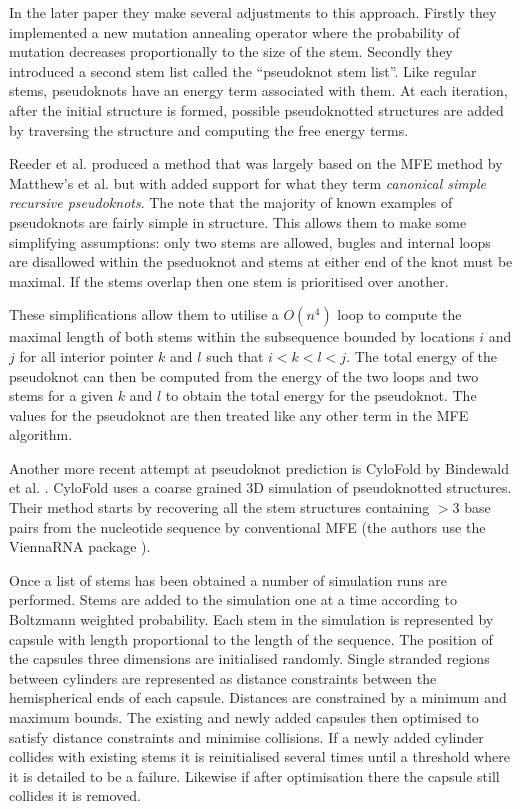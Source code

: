 \documentclass[journal]{IEEEtran}
\begin{document}
In the later paper \cite{shapiro1997predicting} they make several adjustments to this approach. Firstly they implemented a new mutation annealing operator where the probability of mutation decreases proportionally to the size of the stem. Secondly they introduced a second stem list called the ``pseudoknot stem list''. Like regular stems, pseudoknots have an energy term associated with them. At each iteration, after the initial structure is formed, possible pseudoknotted structures are added by traversing the structure and computing the free energy terms.

Reeder et al. \cite{reeder2007pknotsrg} produced a method that was largely based on the MFE method by Matthew's et al. \cite{mathews1999expanded} but with added support for what they term \textit{canonical simple recursive pseudoknots}. The note that the majority of known examples of pseudoknots are fairly simple in structure. This allows them to make some simplifying assumptions: only two stems are allowed, bugles and internal loops are disallowed within the pseduoknot and stems at either end of the knot must be maximal. If the stems overlap then one stem is prioritised over another. 

These simplifications allow them to utilise a $O(n^4)$ loop to compute the maximal length of both stems within the subsequence bounded by locations $i$ and $j$ for all interior pointer $k$ and $l$ such that $i < k < l < j$. The total energy of the pseudoknot can then be computed from the energy of the two loops and two stems for a given $k$ and $l$ to obtain the total energy for the pseudoknot. The values for the pseudoknot are then treated like any other term in the MFE algorithm.

Another more recent attempt at pseudoknot prediction is CyloFold by Bindewald et al. \cite{bindewald2010cylofold}. CyloFold uses a coarse grained 3D simulation of pseudoknotted structures. Their method starts by recovering all the stem structures containing $>3$ base pairs from the nucleotide sequence by conventional MFE (the authors use the ViennaRNA package \cite{lorenz2011viennarna}). 

Once a list of stems has been obtained a number of simulation runs are performed. Stems are added to the simulation one at a time according to Boltzmann weighted probability. Each stem in the simulation is represented by capsule with length proportional to the length of the sequence. The position of the capsules three dimensions are initialised randomly. Single stranded regions between cylinders are represented as distance constraints between the hemispherical ends of each capsule. Distances are constrained by a minimum and maximum bounds. The existing and newly added capsules then optimised to satisfy distance constraints and minimise collisions. If a newly added cylinder collides with existing stems it is reinitialised several times until a threshold where it is detailed to be a failure. Likewise if after optimisation there the capsule still collides it is removed.
\end{document}
